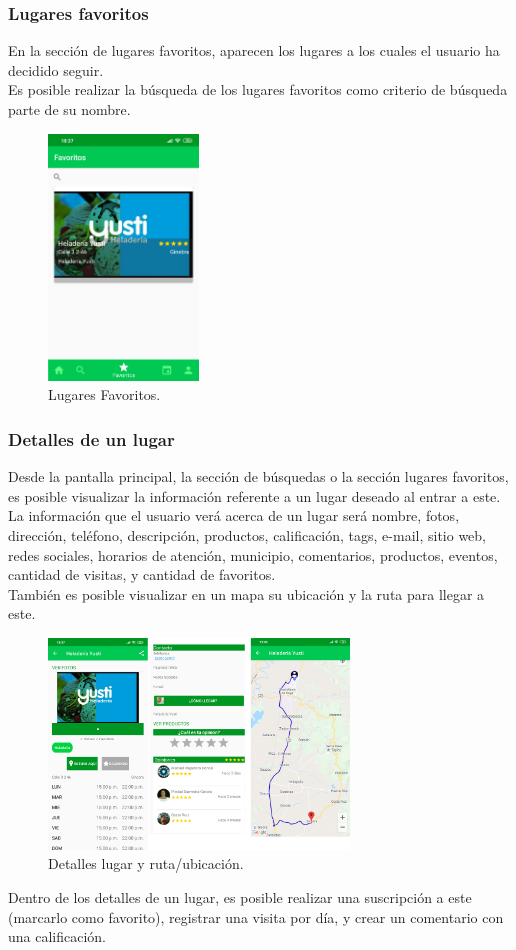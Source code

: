 \documentclass[12pt,letterpaper,openany]{book}
\begin{document}
\subsubsection{Lugares favoritos}
En la sección de lugares favoritos, aparecen los lugares a los cuales el usuario ha decidido seguir.\\
Es posible realizar la búsqueda de los lugares favoritos como criterio de búsqueda parte de su nombre.
\begin{figure}[H]
\begin{center}
\includegraphics[width=4cm]{./imagenes/3}
\caption{Lugares Favoritos.}
\end{center}
\end{figure}

\subsubsection{Detalles de un lugar}
Desde la pantalla principal, la sección de búsquedas o la sección lugares favoritos, es posible visualizar la información referente a un lugar deseado al entrar a este.
\vspace{5mm}\newline
La información que el usuario verá acerca de un lugar será nombre, fotos, dirección, teléfono, descripción, productos, calificación, tags, e-mail, sitio web, redes sociales, horarios de atención, municipio, comentarios, productos, eventos, cantidad de visitas, y cantidad de favoritos.\\
También es posible visualizar en un mapa su ubicación y la ruta para llegar a este.
\begin{figure}[H]
\begin{center}
\includegraphics[width=8cm]{./imagenes/4}
\caption{Detalles lugar y ruta/ubicación.}
\end{center}
\end{figure}
Dentro de los detalles de un lugar, es posible realizar una suscripción a este (marcarlo como favorito), registrar una visita por día, y crear un comentario con una calificación.
\end{document}
